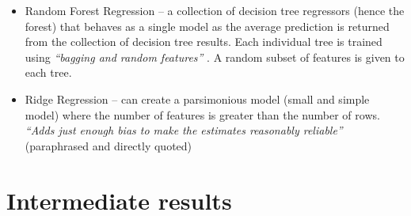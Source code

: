 \documentclass[a4pape, 11pt, english]{article}
\begin{document}
\begin{itemize}
	\item Random Forest Regression – a collection of decision tree regressors (hence the forest) that behaves as a single model as the average prediction is returned from the collection of decision tree results. Each individual tree is trained using \textit{“bagging and random features”} \citep{schapire_robert_random_2001}. A random subset of features is given to each tree.
	\item Ridge Regression – can create a parsimonious model (small and simple model) where the number of features is greater than the number of rows. \textit{“Adds just enough bias to make the estimates reasonably reliable”} \citep{stephanie_ridge_2017} (paraphrased and directly quoted) 
\end{itemize}

\section{Intermediate results}
\end{document}
